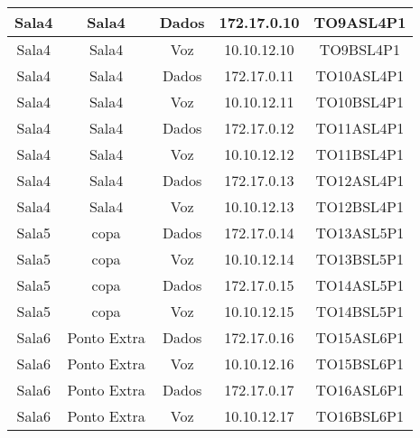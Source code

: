 \begin{table}[]
\begin{tabular}{ccccc}
Sala4 & Sala4              & Dados       	 & 172.17.0.10   & TO9ASL4P1            \\ \hline
Sala4 & Sala4              & Voz             & 10.10.12.10   & TO9BSL4P1            \\ \hline
Sala4 & Sala4              & Dados       	 & 172.17.0.11   & TO10ASL4P1           \\ \hline
Sala4 & Sala4              & Voz             & 10.10.12.11   & TO10BSL4P1           \\ \hline
Sala4 & Sala4              & Dados       	 & 172.17.0.12   & TO11ASL4P1           \\ \hline
Sala4 & Sala4              & Voz             & 10.10.12.12   & TO11BSL4P1           \\ \hline
Sala4 & Sala4              & Dados       	 & 172.17.0.13   & TO12ASL4P1           \\ \hline
Sala4 & Sala4              & Voz             & 10.10.12.13   & TO12BSL4P1           \\ \hline
Sala5 & copa               & Dados        	 & 172.17.0.14   & TO13ASL5P1           \\ \hline
Sala5 & copa               & Voz             & 10.10.12.14   & TO13BSL5P1           \\ \hline
Sala5 & copa               & Dados        	 & 172.17.0.15   & TO14ASL5P1           \\ \hline
Sala5 & copa               & Voz             & 10.10.12.15   & TO14BSL5P1           \\ \hline
Sala6 & Ponto Extra        & Dados        	 & 172.17.0.16   & TO15ASL6P1           \\ \hline
Sala6 & Ponto Extra        & Voz             & 10.10.12.16   & TO15BSL6P1           \\ \hline
Sala6 & Ponto Extra        & Dados       	 & 172.17.0.17   & TO16ASL6P1           \\ \hline
Sala6 & Ponto Extra        & Voz             & 10.10.12.17   & TO16BSL6P1           \\ \hline
\end{tabular}
\end{table}